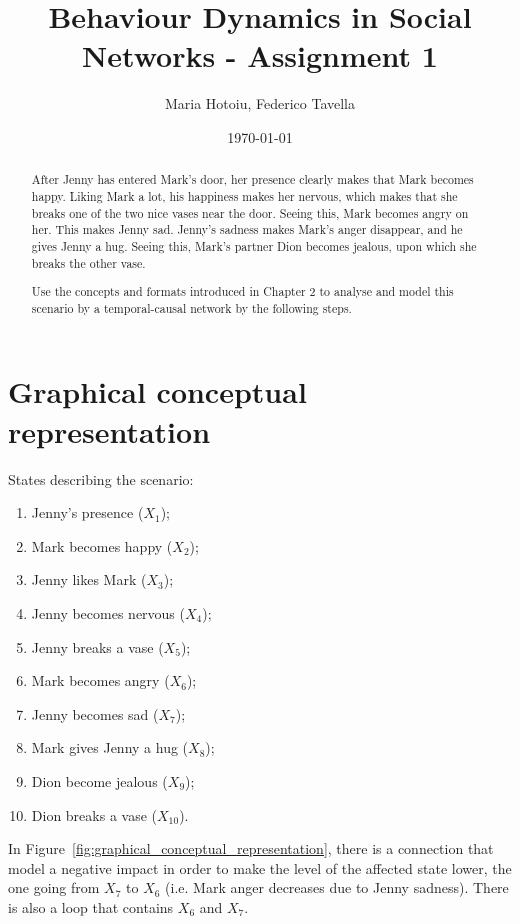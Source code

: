 \documentclass[a4paper]{article}
\title{Behaviour Dynamics in Social Networks - Assignment 1}
\author{Maria Hotoiu, Federico Tavella}
\date{\today}
\begin{document}
\maketitle

\begin{abstract}
After Jenny has entered Mark’s door, her presence clearly makes that Mark becomes happy. Liking Mark a lot, his happiness makes her nervous, which makes that she breaks one of the two nice vases near the door. Seeing this, Mark becomes angry on her. This makes Jenny sad. Jenny’s sadness makes Mark’s anger disappear, and he gives Jenny a hug. Seeing this, Mark’s partner Dion becomes jealous, upon which she breaks the other vase.

Use the concepts and formats introduced in Chapter 2 to analyse and model this scenario by a temporal-causal network by the following steps.
\end{abstract}

\section{Graphical conceptual representation}
\label{sec:graphical_conceptual_representation}

States describing the scenario:

\begin{enumerate}
\item Jenny's presence ($X_1$);
\item Mark becomes happy ($X_2$);
\item Jenny likes Mark ($X_3$);
\item Jenny becomes nervous ($X_4$);
\item Jenny breaks a vase ($X_5$);
\item Mark becomes angry ($X_6$);
\item Jenny becomes sad ($X_7$);
\item Mark gives Jenny a hug ($X_8$);
\item Dion become jealous ($X_9$);
\item Dion breaks a vase ($X_10$).
\end{enumerate}

In Figure~\ref{fig:graphical_conceptual_representation}, there is a connection that model a negative impact in order to make the level of the affected state lower, the one going from $X_7$ to $X_6$ (i.e. Mark anger decreases due to Jenny sadness). There is also a loop that contains $X_6$ and $X_7$.
\end{document}
